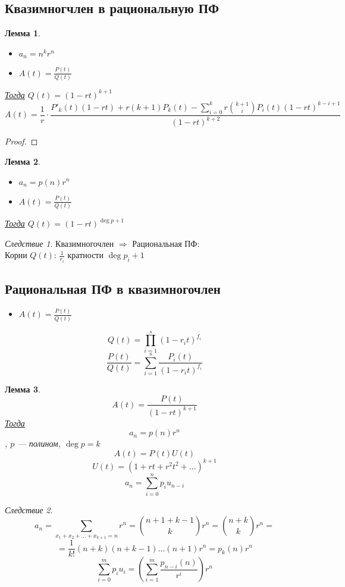 \documentclass[oneside]{book}
\newcommand{\todo}{{\color{red}\fbox{\text{Доделать}}}}
\theoremstyle{plain}
\newtheorem{lemma}{Лемма}
\theoremstyle{remark}
\newtheorem{corollary}{Следствие}[theorem]
\theoremstyle{definition}
\begin{document}
\subsection{Квазимногчлен в рациональную ПФ}
\label{sec:orgba33e9f}
\begin{lemma}
\-
\begin{itemize}
\item \(a_n = n^k r^n\)
\item \(A(t) = \frac{P(t)}{Q(t)}\)
\end{itemize}
\uline{Тогда} \(Q(t) = (1 - rt)^{k + 1}\)
\[ A(t) = \frac{1}{r}\cdot \frac{P'_k(t)(1 - rt) + r(k + 1)P_k(t) - \sum_{i = 0}^k r \binom{k + 1}{i} P_i(t) (1 - rt)^{k - i + 1}}{(1 - rt)^{k + 2}} \]
\end{lemma}
\begin{proof}
\todo
\end{proof}
\begin{lemma}
\-
\begin{itemize}
\item \(a_n = p(n) r^n\)
\item \(A(t) = \frac{P(t)}{Q(t)}\)
\end{itemize}
\uline{Тогда} \(Q(t) = (1 - rt)^{\deg p + 1}\)
\end{lemma}
\begin{corollary}
Квазимногочлен \(\Rightarrow\) Рациональная ПФ: \\
Корни \(Q(t)\): \(\frac{1}{r_i}\) кратности \(\deg p_i + 1\)
\end{corollary}

\subsection{Рациональная ПФ в квазимногочлен}
\label{sec:org3738974}
\begin{itemize}
\item \(A(t) = \frac{P(t)}{Q(t)}\)
\end{itemize}
\[ Q(t) = \prod_{i = 1}^s (1 - r_it)^{f_i} \]
\[ \frac{P(t)}{Q(t)} = \sum_{i = 1}^s \frac{P_i(t)}{(1 - r_i t)^{f_i}} \]
\begin{lemma}
\[ A(t) = \frac{P(t)}{(1 - rt)^{k + 1}} \]
\uline{Тогда} \[ a_n = p(n) r^n \], \(p\) --- полином, \(\deg p = k\)
\[ A(t) = P(t) U(t) \]
\[ U(t) = (1 + rt + r^2 t^2 + \dots)^{k + 1} \]
\[ a_n = \sum_{i = 0}^n p_i u_{n - i} \]
\end{lemma}
\begin{corollary}
\[ a_n = \sum_{x_1 + x_2 + \dots + x_{k + 1} = n} r^n = \binom{n + 1 + k - 1}{k}r^n = \binom{n + k}{k}r^n = \]
\[ = \frac{1}{k!}(n + k)(n + k - 1)\dots(n + 1)r^n = p_k(n)r^n \]
\[ \sum_{i = 0}^m p_i u_i = \left(\sum_{i = 1}^m \frac{p_{n - i}(n)}{r^i}\right)r^n \]
\end{corollary}
\end{document}
